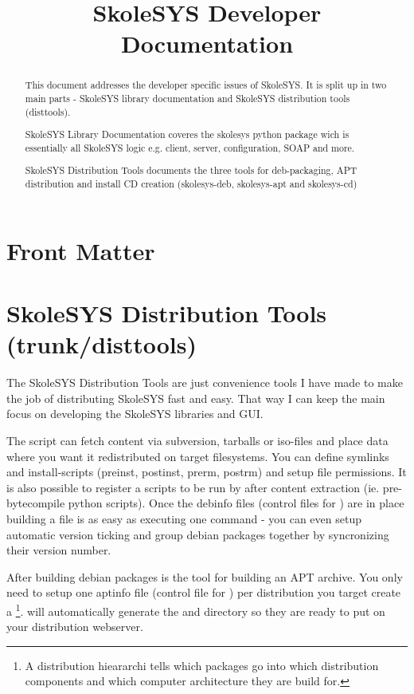 \documentclass{manual}
\title{SkoleSYS Developer Documentation}
\begin{document}
\maketitle

\ifhtml
\chapter*{Front Matter\label{front}}
\fi

\begin{abstract}

\noindent
This document addresses the developer specific issues of SkoleSYS. It is
split up in two main parts - SkoleSYS library documentation and SkoleSYS
distribution tools (disttools).

SkoleSYS Library Documentation coveres the skolesys python package wich
is essentially all SkoleSYS logic e.g. client, server, configuration, SOAP
and more.

SkoleSYS Distribution Tools documents the three tools for deb-packaging,
APT distribution and install CD creation (skolesys-deb, skolesys-apt and 
skolesys-cd)

\end{abstract}

\tableofcontents

\chapter{SkoleSYS Distribution Tools (trunk/disttools)\label{disttools}}
The SkoleSYS Distribution Tools are just convenience tools I have made to make the job of distributing SkoleSYS fast and easy. That way I can keep the main focus on developing the SkoleSYS libraries and GUI. 

The  script can fetch content via subversion, tarballs or iso-files and place data where you want it redistributed on target filesystems. You can define symlinks and install-scripts (preinst, postinst, prerm, postrm) and setup file permissions. It is also possible to register a scripts to be run by  after content extraction (ie. pre-bytecompile python scripts). Once the debinfo files (control files for ) are in place building a file is as easy as executing one command - you can even setup automatic version ticking and group debian packages together by syncronizing their version number.

After building debian packages  is the tool for building an APT archive. You only need to setup one aptinfo file (control file for ) per distribution you target create a \footnote{A distribution hieararchi tells  which packages go into which distribution components and which computer architecture they are build for.}.  will automatically generate the  and  directory so they are ready to put on your distribution webserver.


%


%


\end{document}
